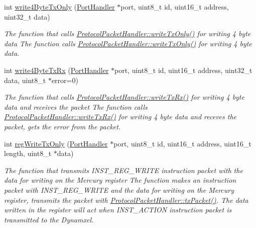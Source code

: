 \begin{DoxyCompactItemize}
int \hyperlink{classmercury_1_1_protocol_packet_handler_a88c64703e5947188e7c83d57dd2a8ffc}{write4\+Byte\+Tx\+Only} (\hyperlink{classmercury_1_1_port_handler}{Port\+Handler} $\ast$port, uint8\+\_\+t id, uint16\+\_\+t address, uint32\+\_\+t data)
\begin{DoxyCompactList}\small\item\em The function that calls \hyperlink{classmercury_1_1_protocol_packet_handler_adf6e96b412135484dac0ff7ff9c2bf36}{Protocol\+Packet\+Handler\+::write\+Tx\+Only()} for writing 4 byte data  The function calls \hyperlink{classmercury_1_1_protocol_packet_handler_adf6e96b412135484dac0ff7ff9c2bf36}{Protocol\+Packet\+Handler\+::write\+Tx\+Only()} for writing 4 byte data. \end{DoxyCompactList}\item 
int \hyperlink{classmercury_1_1_protocol_packet_handler_abdcdc58ceead4033768386c5de3eb066}{write4\+Byte\+Tx\+Rx} (\hyperlink{classmercury_1_1_port_handler}{Port\+Handler} $\ast$port, uint8\+\_\+t id, uint16\+\_\+t address, uint32\+\_\+t data, uint8\+\_\+t $\ast$error=0)
\begin{DoxyCompactList}\small\item\em The function that calls \hyperlink{classmercury_1_1_protocol_packet_handler_a13921f2ddae0c1f1f7ac3669d1a15470}{Protocol\+Packet\+Handler\+::write\+Tx\+Rx()} for writing 4 byte data and receives the packet  The function calls \hyperlink{classmercury_1_1_protocol_packet_handler_a13921f2ddae0c1f1f7ac3669d1a15470}{Protocol\+Packet\+Handler\+::write\+Tx\+Rx()} for writing 4 byte data and receves the packet,  gets the error from the packet. \end{DoxyCompactList}\item 
int \hyperlink{classmercury_1_1_protocol_packet_handler_af43e9f53d3e295b12b69f4b99c8c1746}{reg\+Write\+Tx\+Only} (\hyperlink{classmercury_1_1_port_handler}{Port\+Handler} $\ast$port, uint8\+\_\+t id, uint16\+\_\+t address, uint16\+\_\+t length, uint8\+\_\+t $\ast$data)
\begin{DoxyCompactList}\small\item\em The function that transmits I\+N\+S\+T\+\_\+\+R\+E\+G\+\_\+\+W\+R\+I\+TE instruction packet with the data for writing on the Mercury register  The function makes an instruction packet with I\+N\+S\+T\+\_\+\+R\+E\+G\+\_\+\+W\+R\+I\+TE and the data for writing on the Mercury register,  transmits the packet with \hyperlink{classmercury_1_1_protocol_packet_handler_a245f01395d9684bc58788e8a06de3ffc}{Protocol\+Packet\+Handler\+::tx\+Packet()}.  The data written in the register will act when I\+N\+S\+T\+\_\+\+A\+C\+T\+I\+ON instruction packet is transmitted to the Dynamxel. \end{DoxyCompactList}\item 

\end{DoxyCompactItemize}
